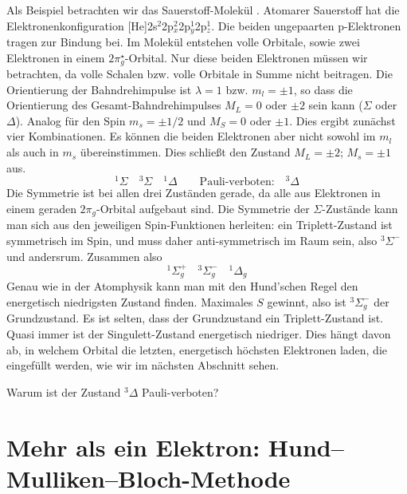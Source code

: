 Als Beispiel betrachten wir das Sauerstoff-Molekül . Atomarer Sauerstoff hat die Elektronenkonfiguration [He]2s$^2$2p$_x^2$2p$_y^1$2p$_z^1$. Die beiden ungepaarten p-Elektronen tragen zur Bindung bei. Im Molekül entstehen volle Orbitale, sowie zwei Elektronen in einem $2\pi_g^\star$-Orbital. Nur diese beiden Elektronen müssen wir betrachten, da volle Schalen bzw. volle Orbitale in Summe nicht beitragen. Die Orientierung der  Bahndrehimpulse ist  $\lambda = 1$ bzw. $m_l = \pm 1$, so dass die Orientierung des Gesamt-Bahndrehimpulses $M_L = 0$ oder $\pm 2$ sein kann ($\Sigma$ oder $\Delta$). Analog für den Spin $m_s = \pm 1/2$ und $M_S = 0 $ oder $\pm 1$. Dies ergibt zunächst  vier  Kombinationen. Es können die beiden Elektronen aber nicht sowohl im $m_l$ als auch in $m_s$ übereinstimmen. Dies schließt den Zustand $M_L = \pm 2$; $M_s = \pm 1$ aus.
\begin{equation}
 ^1\Sigma \quad ^3\Sigma \quad ^1\Delta \qquad \text{Pauli-verboten:} \quad ^3\Delta  
\end{equation}
Die Symmetrie ist bei allen drei Zuständen gerade, da alle aus  Elektronen in einem geraden $2\pi_g$-Orbital aufgebaut sind. Die Symmetrie der $\Sigma$-Zustände kann man sich aus den jeweiligen Spin-Funktionen herleiten: ein Triplett-Zustand ist symmetrisch im Spin, und muss daher anti-symmetrisch im Raum sein, also $^3\Sigma^-$ und andersrum. Zusammen also
\begin{equation}
 ^1\Sigma_g^+ \quad ^3\Sigma_g^- \quad ^1\Delta _g
\end{equation}
Genau wie in der Atomphysik kann man mit den Hund'schen Regel den energetisch niedrigsten Zustand finden. Maximales $S$ gewinnt, also ist $^3\Sigma_g^- $ der Grundzustand. Es ist selten, dass der Grundzustand ein Triplett-Zustand ist. Quasi immer ist der Singulett-Zustand energetisch niedriger. Dies hängt davon ab, in welchem Orbital die letzten, energetisch höchsten Elektronen laden, die eingefüllt werden, wie wir im nächsten Abschnitt sehen.

\begin{questions} 
\item Warum ist der Zustand $^3\Delta $ Pauli-verboten?
\end{questions}




\section{Mehr als ein Elektron: Hund--Mulliken--Bloch-Methode }

